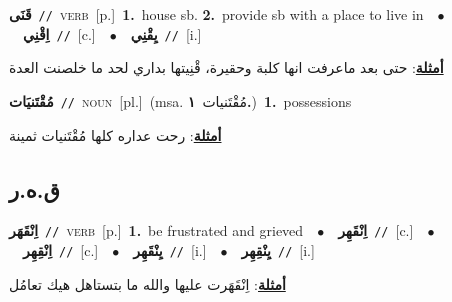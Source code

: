 \documentclass[10pt,a4paper,twoside]{article} %
\begin{document}
\begin{multicols}{2}
{\setlength\topsep{0pt}\textbf{\foreignlanguage{arabic}{قَنَى}}\ {\color{gray}\texttt{//}\color{black}}\ \textsc{verb}\ [p.]\ \textbf{1.}~house sb.  \textbf{2.}~provide sb with a place to live in\ \ $\bullet$\ \ \setlength\topsep{0pt}\textbf{\foreignlanguage{arabic}{اِقْنِي}}\ {\color{gray}\texttt{//}\color{black}}\ [c.]\ \ $\bullet$\ \ \setlength\topsep{0pt}\textbf{\foreignlanguage{arabic}{يِقْنِي}}\ {\color{gray}\texttt{//}\color{black}}\ [i.]\  \begin{flushright}\color{gray}\foreignlanguage{arabic}{\textbf{\underline{\foreignlanguage{arabic}{أمثلة}}}: حتى بعد ماعرفت انها كلبة وحقيرة، قْنِيتها بداري لحد ما خلصنت العدة}\end{flushright}\color{black}} \vspace{2mm}

{\setlength\topsep{0pt}\textbf{\foreignlanguage{arabic}{مُقْتَنيَات}}\ {\color{gray}\texttt{//}\color{black}}\ \textsc{noun}\ [pl.]\ \color{gray}(msa. \foreignlanguage{arabic}{مُقْتَنيات}~\foreignlanguage{arabic}{\textbf{١.}})\color{black}\ \textbf{1.}~possessions\  \begin{flushright}\color{gray}\foreignlanguage{arabic}{\textbf{\underline{\foreignlanguage{arabic}{أمثلة}}}: رحت عداره كلها مُقْتَنيات ثمينة}\end{flushright}\color{black}} \vspace{2mm}

\vspace{-3mm}
\subsection*{\color{blue}\foreignlanguage{arabic}{ق.ه.ر}\color{blue}{}} 

{\setlength\topsep{0pt}\textbf{\foreignlanguage{arabic}{اِنْقَهَر}}\ {\color{gray}\texttt{//}\color{black}}\ \textsc{verb}\ [p.]\ \textbf{1.}~be frustrated and grieved\ \ $\bullet$\ \ \setlength\topsep{0pt}\textbf{\foreignlanguage{arabic}{اِنْقَهِر}}\ {\color{gray}\texttt{//}\color{black}}\ [c.]\ \ $\bullet$\ \ \setlength\topsep{0pt}\textbf{\foreignlanguage{arabic}{اِنْقِهِر}}\ {\color{gray}\texttt{//}\color{black}}\ [c.]\ \ $\bullet$\ \ \setlength\topsep{0pt}\textbf{\foreignlanguage{arabic}{يِنْقَهِر}}\ {\color{gray}\texttt{//}\color{black}}\ [i.]\ \ $\bullet$\ \ \setlength\topsep{0pt}\textbf{\foreignlanguage{arabic}{يِنْقِهِر}}\ {\color{gray}\texttt{//}\color{black}}\ [i.]\  \begin{flushright}\color{gray}\foreignlanguage{arabic}{\textbf{\underline{\foreignlanguage{arabic}{أمثلة}}}: اِنْقَهَرت عليها والله ما بتستاهل هيك تعامُل}\end{flushright}\color{black}} \vspace{2mm}


\end{multicols}
\end{document}
